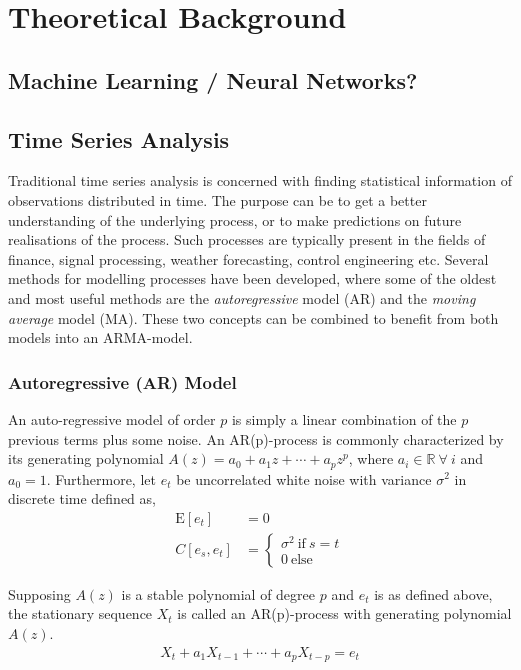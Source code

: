 \chapter{Theoretical Background}
\section{Machine Learning / Neural Networks?}

\section{Time Series Analysis}

Traditional time series analysis is concerned with finding statistical information of observations distributed in time. The purpose can be to get a better understanding of the underlying process, or to make predictions on future realisations of the process. Such processes are typically present in the fields of finance, signal processing, weather forecasting, control engineering etc. Several methods for modelling processes have been developed, where some of the oldest and most useful methods are the \textit{autoregressive} model (AR) and the \textit{moving average} model (MA). These two concepts can be combined to benefit from both models into an ARMA-model.

\subsection{Autoregressive (AR) Model} \label{sub:ar}
An auto-regressive model of order $p$ is simply a linear combination of the $p$ previous terms plus some noise. An AR(p)-process is commonly characterized by its generating polynomial $A(z) = a_0 + a_1z + \cdots + a_pz^p$, where $a_i \in \mathbb{R} \ \forall \ i$ and $a_0=1$. Furthermore, let $e_t$ be uncorrelated white noise with variance $\sigma^2$ in discrete time defined as, 
\begin{align}
    \text{E}[e_t] &= 0 \label{eq:wne}\\
    C[e_s, e_t] &= \begin{cases}
    \sigma^2 \ \text{if} \ s=t \\
    0 \ \text{else}
    \end{cases} \label{eq:wnc}
\end{align}

Supposing $A(z)$ is a stable polynomial of degree $p$ and $e_t$ is as defined above, the stationary sequence $X_t$ is called an AR(p)-process with generating polynomial $A(z)$. 
\begin{align}
    X_t + a_1 X_{t-1} + \cdots + a_p X_{t-p} = e_t
    \label{eq:ar}
\end{align}


